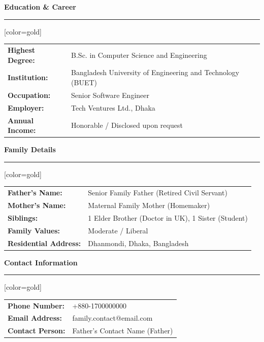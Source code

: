 \documentclass[11pt,a4paper]{article}
\begin{document}
\vspace{0.8cm}
\noindent
\textbf{\large \color{maroon} Education \& Career}
\vspace{0.2cm}
\hrule[color=gold]
\vspace{0.4cm}

\noindent
\begin{tabularx}{\textwidth}{@{}l X@{}}
    \textbf{Highest Degree:} & B.Sc. in Computer Science and Engineering \\
    \textbf{Institution:} & Bangladesh University of Engineering and Technology (BUET) \\
    \textbf{Occupation:} & Senior Software Engineer \\
    \textbf{Employer:} & Tech Ventures Ltd., Dhaka \\
    \textbf{Annual Income:} & Honorable / Disclosed upon request
\end{tabularx}

\vspace{0.8cm}
\noindent
\textbf{\large \color{maroon} Family Details}
\vspace{0.2cm}
\hrule[color=gold]
\vspace{0.4cm}

\noindent
\begin{tabularx}{\textwidth}{@{}l X@{}}
    \textbf{Father's Name:} & Senior Family Father (Retired Civil Servant) \\
    \textbf{Mother's Name:} & Maternal Family Mother (Homemaker) \\
    \textbf{Siblings:} & 1 Elder Brother (Doctor in UK), 1 Sister (Student) \\
    \textbf{Family Values:} & Moderate / Liberal \\
    \textbf{Residential Address:} & Dhanmondi, Dhaka, Bangladesh
\end{tabularx}

\vspace{0.8cm}
\noindent
\textbf{\large \color{maroon} Contact Information}
\vspace{0.2cm}
\hrule[color=gold]
\vspace{0.4cm}

\noindent
\begin{tabularx}{\textwidth}{@{}l X@{}}
    \textbf{Phone Number:} & +880-1700000000 \\
    \textbf{Email Address:} & family.contact@email.com \\
    \textbf{Contact Person:} & Father's Contact Name (Father)
\end{tabularx}
\end{document}
